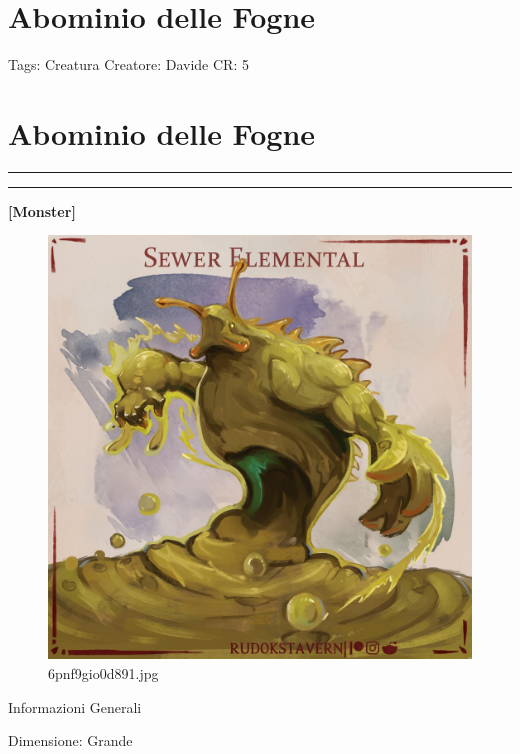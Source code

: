\section{Abominio delle Fogne}\label{abominio-delle-fogne}

Tags: Creatura Creatore: Davide CR: 5

\section{\texorpdfstring{\textbf{Abominio delle
Fogne}}{Abominio delle Fogne}}\label{abominio-delle-fogne-1}

\begin{center}\rule{0.5\linewidth}{0.5pt}\end{center}

\begin{center}\rule{0.5\linewidth}{0.5pt}\end{center}

\textbf{{[}Monster{]}}

\begin{figure}
\centering
\includegraphics{6pnf9gio0d891.jpg}
\caption{6pnf9gio0d891.jpg}
\end{figure}

Informazioni Generali

Dimensione: Grande

